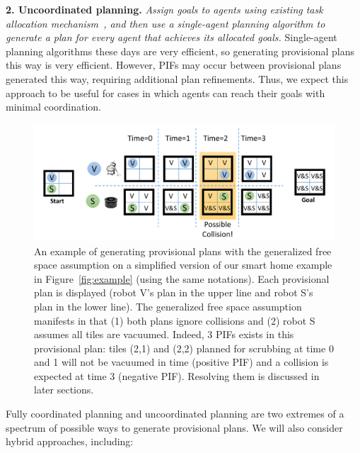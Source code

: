 \documentclass[11pt]{article}
\begin{document}

{\bf 2. Uncoordinated planning.} {\em Assign goals to agents using existing task allocation mechanism~\cite{hunsberger2000combinatorial,sander2002scalable}, and then use a single-agent planning algorithm to generate a plan for every agent that achieves its allocated goals. }
Single-agent planning algorithms these days are very efficient, so generating provisional plans this way is very efficient. However, PIFs may occur between provisional plans generated this way, requiring additional plan refinements. Thus, we expect this approach to be useful for cases in which agents can reach their goals with minimal coordination. 


\begin{figure}%
\centering
\includegraphics[width=0.8\columnwidth]{free-space_cropped.pdf}%
\vspace{-0.4cm}
\caption{{\small An example of generating provisional plans with the generalized free space assumption on a simplified version of our smart home example in Figure~\ref{fig:example} (using the same notations). 
Each provisional plan is displayed (robot V's plan in the upper line and robot S's plan in the lower line). The generalized free space assumption manifests in that (1) both plans ignore collisions and (2) robot S assumes all tiles are vacuumed. Indeed, 3 PIFs exists in this provisional plan: tiles (2,1) and (2,2) planned for scrubbing at time 0 and 1 will not be vacuumed in time (positive PIF) and a collision is expected at time 3 (negative PIF). Resolving them is discussed in later sections.}}
\label{fig:free-space}
\end{figure}


Fully coordinated planning and uncoordinated planning are two extremes of a spectrum of possible ways to generate provisional plans. We will also consider hybrid approaches, including:
\end{document}
